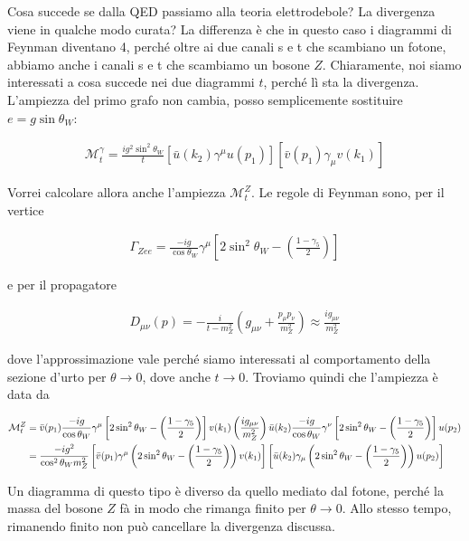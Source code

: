 \documentclass[11pt]{report}
\begin{document}
Cosa succede se dalla QED passiamo alla teoria elettrodebole? La divergenza viene in qualche modo curata? La differenza è che in questo caso i diagrammi di Feynman diventano 4, perché oltre ai due canali s e t che scambiano un fotone, abbiamo anche i canali s e t che scambiamo un bosone \(Z\). Chiaramente, noi siamo interessati a cosa succede nei due diagrammi \(t\), perché lì sta la divergenza. L'ampiezza del primo grafo non cambia, posso semplicemente sostituire \(e = g\sin\theta_W\): 

\begin{align}
    \mathcal{M}_t^\gamma = \frac{ig^2\sin^2\theta_W}{t}[\bar{u}(k_2)\gamma^\mu u(p_1)][\bar{v}(p_1)\gamma_\mu v(k_1)]
\end{align}

Vorrei calcolare allora anche l'ampiezza \(\mathcal{M}_t^Z\). Le regole di Feynman sono, per il vertice 

\begin{align}
    \Gamma_{Zee} = \frac{-ig}{\cos\theta_W}\gamma^\mu \left[2\sin^2\theta_W - \left(\frac{1-\gamma_5}{2}\right)\right]
\end{align}

e per il propagatore 

\begin{align}
    D_{\mu\nu}(p) = -\frac{i}{t-m^2_Z}\left(g_{\mu\nu} + \frac{p_\mu p_\nu}{m^2_Z}\right) \approx \frac{ig_{\mu\nu}}{m^2_Z}
\end{align}

dove l'approssimazione vale perché siamo interessati al comportamento della sezione d'urto per \(\theta \to 0\), dove anche \(t \to 0\). Troviamo quindi che l'ampiezza è data da 

\begin{align}
    \mathcal{M}_t^Z &= \bar{v}(p_1)\frac{-ig}{\cos\theta_W}\gamma^\mu \left[2\sin^2\theta_W - \left(\frac{1-\gamma_5}{2}\right)\right]v(k_1)\left(\frac{ig_{\mu\nu}}{m^2_Z} \right)\bar{u}(k_2)\frac{-ig}{\cos\theta_W}\gamma^\nu \left[2\sin^2\theta_W - \left(\frac{1-\gamma_5}{2}\right)\right] u(p_2) \notag \\
    &= \frac{-ig^2}{\cos^2\theta_W m^2_Z}\left[\bar{v}(p_1)\gamma^\mu \left(2\sin^2\theta_W - \left(\frac{1-\gamma_5}{2}\right)\right)v(k_1) \right]\left[\bar{u}(k_2)\gamma_\mu \left(2\sin^2\theta_W - \left(\frac{1-\gamma_5}{2}\right)\right)u(p_2) \right]
\end{align}

Un diagramma di questo tipo è diverso da quello mediato dal fotone, perché la massa del bosone \(Z\) fà in modo che rimanga finito per \(\theta \to 0\). Allo stesso tempo, rimanendo finito non può cancellare la divergenza discussa. 
\end{document}
